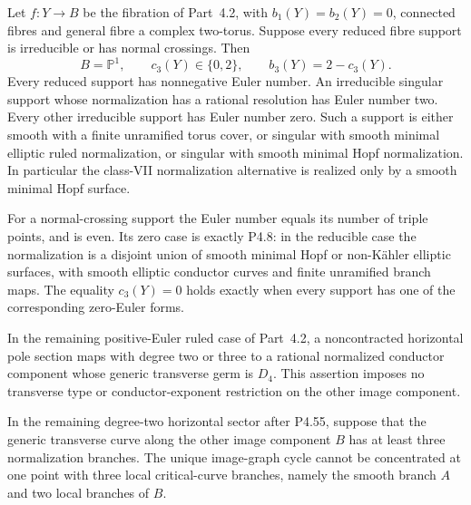 \begin{proposition}[P4.58]\hypertarget{tag-02XX}{}\label{night:P4.58}\label{stmt:P4.58}


Let $f:Y\to B$ be the fibration of Part~4.2, with
$b_1(Y)=b_2(Y)=0$, connected fibres and general fibre a
complex two-torus. Suppose every reduced fibre support
is irreducible or has normal crossings. Then
\[
 B=\mathbb P^1,\qquad c_3(Y)\in\{0,2\},
                       \qquad b_3(Y)=2-c_3(Y).
\]
Every reduced support has nonnegative Euler number.
An irreducible singular support whose normalization has
a rational resolution has Euler number two. Every other
irreducible support has Euler number zero. Such a support
is either smooth with a finite unramified torus cover,
or singular with smooth minimal elliptic ruled
normalization, or singular with smooth minimal Hopf
normalization. In particular the class-VII normalization
alternative is realized only by a smooth minimal Hopf
surface.

For a normal-crossing support the Euler number equals
its number of triple points, and is even. Its zero case
is exactly P4.8: in the reducible case the normalization
is a disjoint union of smooth minimal Hopf or non-K\"ahler
elliptic surfaces, with smooth elliptic conductor curves
and finite unramified branch maps. The equality
$c_3(Y)=0$ holds exactly when every support has one of
the corresponding zero-Euler forms.
\end{proposition}

\begin{proposition}[P4R.18]\hypertarget{tag-02YB}{}\label{night:P4R.18}\label{stmt:P4R.18}


In the remaining positive-Euler ruled case of Part~4.2, a
noncontracted horizontal pole section maps with degree two or
three to a rational normalized conductor component whose generic
transverse germ is $D_4$. This assertion imposes no transverse
type or conductor-exponent restriction on the other image component.
\end{proposition}

\begin{proposition}[P4R.20]\hypertarget{tag-02YE}{}\label{night:P4R.20}\label{stmt:P4R.20}


In the remaining degree-two horizontal sector after P4.55,
suppose that the generic transverse curve along the other
image component $B$ has at least three normalization branches.
The unique image-graph cycle cannot be concentrated at one
point with three local critical-curve branches, namely the
smooth branch $A$ and two local branches of $B$.
\end{proposition}

